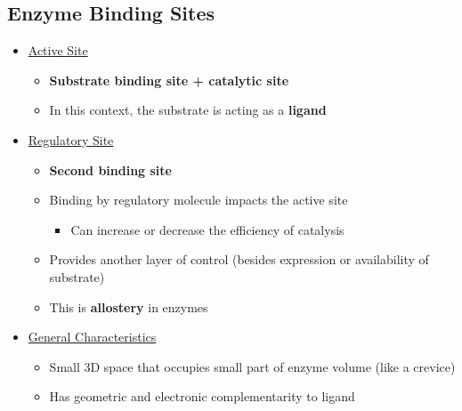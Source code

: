 \documentclass[10pt]{article}
\begin{document}
\subsection*{Enzyme Binding Sites}
\begin{itemize}
    \item \underline{Active Site}
    \begin{itemize}
        \item \textbf{Substrate binding site + catalytic site}
        \item In this context, the substrate is acting as a \textbf{ligand}
    \end{itemize}
    \item \underline{Regulatory Site}
    \begin{itemize}
        \item \textbf{Second binding site}
        \item Binding by regulatory molecule impacts the active site
        \begin{itemize}
            \item Can increase or decrease the efficiency of catalysis
        \end{itemize}
        \item Provides another layer of control (besides expression or availability of substrate)
        \item This is \textbf{allostery} in enzymes
    \end{itemize}
    \item \underline{General Characteristics}
    \begin{itemize}
        \item Small 3D space that occupies small part of enzyme volume (like a crevice)
        \item Has geometric and electronic complementarity to ligand
    \end{itemize}
\end{itemize}
\end{document}
